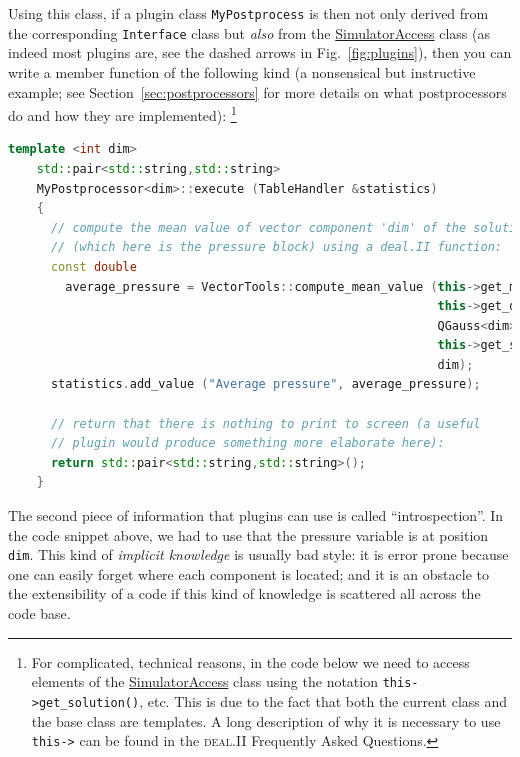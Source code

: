 \documentclass{article}
\newcommand{\dealii}{{\textsc{deal.II}}}
\begin{document}
Using this class, if a plugin class \texttt{MyPostprocess} is then not only
derived from the corresponding \texttt{Interface} class but \textit{also}
from the \href{doc/doxygen/classaspect_1_1SimulatorAccess.html}{SimulatorAccess}
class (as indeed most plugins are, see the dashed arrows in
Fig.~\ref{fig:plugins}), then you can write a member function of the following
kind (a nonsensical but instructive example; see Section~\ref{sec:postprocessors} for more details on what postprocessors do and how they are implemented):%
\footnote{For complicated, technical reasons, in the code below we need to
  access elements of the \href{doc/doxygen/classaspect_1_1SimulatorAccess.html}{SimulatorAccess} class using the notation
  \texttt{this->get\_solution()}, etc. This is due to the fact that both the
  current class and the base class are templates. A long description of
  why it is necessary to use \texttt{this->} can be found in the \dealii{}
  Frequently Asked Questions.}
\begin{lstlisting}[frame=single,language=C++]
    template <int dim>
    std::pair<std::string,std::string>
    MyPostprocessor<dim>::execute (TableHandler &statistics)
    {
      // compute the mean value of vector component 'dim' of the solution
      // (which here is the pressure block) using a deal.II function:
      const double
        average_pressure = VectorTools::compute_mean_value (this->get_mapping(),
                                                            this->get_dof_handler(),
                                                            QGauss<dim>(2),
                                                            this->get_solution(),
                                                            dim);
      statistics.add_value ("Average pressure", average_pressure);

      // return that there is nothing to print to screen (a useful
      // plugin would produce something more elaborate here):
      return std::pair<std::string,std::string>();
    }
\end{lstlisting}

The second piece of information that plugins can use is called ``introspection''.
In the code snippet above, we had to use that the pressure variable is at
position \texttt{dim}. This kind of \textit{implicit knowledge} is usually
bad style: it is error prone because one can easily forget where each
component is located; and it is an obstacle to the extensibility of a code
if this kind of knowledge is scattered all across the code base.
\end{document}
